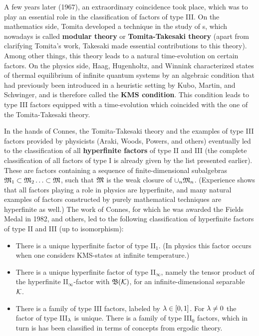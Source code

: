 A few years later (1967), an extraordinary coincidence took place,
which was to play an essential role in the classification of factors
of type III. On the mathematics side, Tomita developed a technique in
the study of \vNa s, which nowadays is called {\bf modular theory} or
{\bf Tomita-Takesaki theory} (apart from clarifying Tomita's work,
Takesaki made essential contributions to this theory). Among other
things, this theory leads to a natural time-evolution on certain
factors.  On the physics side, Haag, Hugenholtz, and Winnink
characterized states of thermal equilibrium of infinite quantum
systems by an algebraic condition that had previously been introduced
in a heuristic setting by Kubo, Martin, and Schwinger, and is
therefore called the {\bf KMS condition}.  This condition leads to
type III factors equipped with a time-evolution which coincided with
the one of the Tomita-Takesaki theory.

In the hands of Connes, the Tomita-Takesaki theory and the examples of
type III factors provided by physicists (Araki, Woods, Powers, and
others) eventually led to the classification of all {\bf hyperfinite
factors} of type II and III (the complete classification of all
factors of type I is already given by the list presented
earlier). These are factors containing a sequence of
finite-dimensional subalgebras ${\frak M}_1\subset{\frak M}_2\ldots\subset{\frak M}$, such
that ${\frak M}$ is the weak closure of $\cup_n{\frak M}_n$. (Experience shows that
all factors playing a role in physics are hyperfinite, and many
natural examples of factors constructed by purely mathematical
techniques are hyperfinite as well.) The work of Connes, for which he
was awarded the Fields Medal in 1982, and others, led to the following
classification of hyperfinite factors of type II and III (up to
isomorphism):
\begin{itemize}
\item 
There is a unique hyperfinite factor of type II$\mbox{}_1$.  (In
 physics this factor occurs when one considers KMS-states at infinite
 temperature.)
\item
There is a unique hyperfinite factor of type II$\mbox{}_{\infty}$,
namely the tensor product of the hyperfinite
II$\mbox{}_{\infty}$-factor with ${\frak B}({\cal K})$, for an
infinite-dimensional separable \Hs\ ${\cal K}$.
\item
There is a family of type III factors, labeled by $\lambda\in [0,1]$. For
$\lambda\neq 0$ the factor of type III$\mbox{}_{\lambda}$ is unique. There is
a family of type III$\mbox{}_0$ factors, which in turn is has been
classified in terms of concepts from ergodic theory.
\end{itemize}

